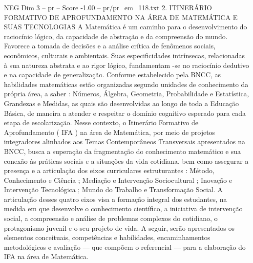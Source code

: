 \begin{textsample}{NEG Dim 3 – pr – Score -1.00 – pr/pr\_em\_118.txt}  \label{ex:f3_neg_136}
2.
ITINERÁRIO FORMATIVO DE APROFUNDAMENTO NA ÁREA DE MATEMÁTICA E SUAS TECNOLOGIAS A Matemática é um caminho para o desenvolvimento do raciocínio lógico, da capacidade de abstração e da compreensão do mundo.
Favorece a tomada de decisões e a análise crítica de fenômenos sociais, econômicos, culturais e ambientais.
Suas especificidades intrínsecas, relacionadas à sua natureza abstrata e ao rigor lógico, fundamentam -se no raciocínio dedutivo e na capacidade de generalização.
Conforme estabelecido pela BNCC, as habilidades matemáticas estão organizadas segundo unidades de conhecimento da própria área, a saber : Números, Álgebra, Geometria, Probabilidade e Estatística, Grandezas e Medidas, as quais são desenvolvidas ao longo de toda a Educação Básica, de maneira a atender e respeitar o domínio cognitivo esperado para cada etapa de escolarização.
Nesse contexto, o Itinerário Formativo de Aprofundamento ( IFA ) na área de Matemática, por meio de projetos integradores alinhados aos Temas Contemporâneos Transversais apresentados na BNCC, busca a superação da fragmentação do conhecimento matemático e sua conexão às práticas sociais e a situações da vida cotidiana, bem como assegurar a presença e a articulação dos eixos curriculares estruturantes : Método, Conhecimento e Ciência ; Mediação e Intervenção Sociocultural ; Inovação e Intervenção Tecnológica ; Mundo do Trabalho e Transformação Social.
A articulação desses quatro eixos visa a formação integral dos estudantes, na medida em que desenvolve o conhecimento científico, a iniciativa de intervenção social, a compreensão e análise de problemas complexos do cotidiano, o protagonismo juvenil e o seu projeto de vida.
A seguir, serão apresentados os elementos conceituais, competências e habilidades, encaminhamentos metodológicos e avaliação — que compõem o referencial — para a elaboração do IFA na área de Matemática.

\end{textsample}
